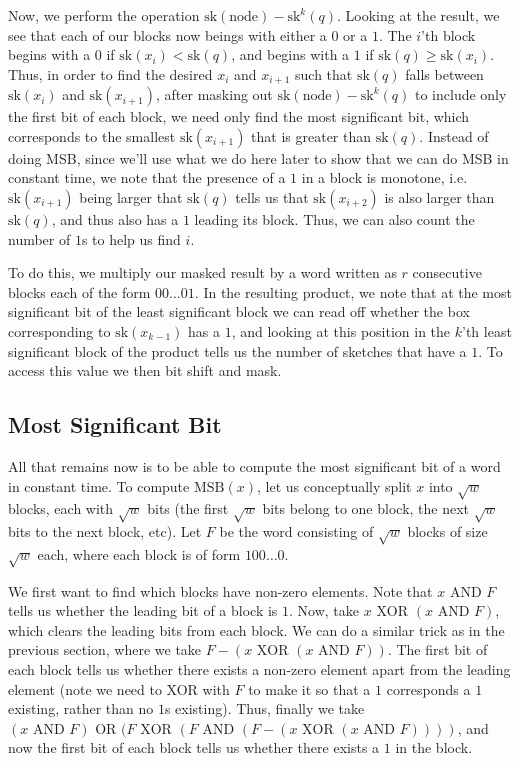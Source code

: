 \documentclass[11pt]{article}
\begin{document}
Now, we perform the operation $\text{sk}(\text{node}) - \text{sk}^k(q)$. Looking at the result, we see that each of our blocks now beings with either a $0$ or a $1$. The $i$'th block begins with a $0$ if $\text{sk}(x_i) < \text{sk}(q)$, and begins with a $1$ if $\text{sk}(q)\geq \text{sk}(x_i)$. Thus, in order to find the desired $x_i$ and $x_{i+1}$ such that $\text{sk}(q)$ falls between $\text{sk}(x_{i})$ and $\text{sk}(x_{i+1})$, after masking out $\text{sk}(\text{node}) - \text{sk}^k(q)$ to include only the first bit of each block, we need only find the most significant bit, which corresponds to the smallest $\text{sk}(x_{i+1})$ that is greater than $\text{sk}(q)$. Instead of doing MSB, since we'll use what we do here later to show that we can do MSB in constant time, we note that the presence of a $1$ in a block is monotone, i.e. $\text{sk}(x_{i+1})$ being larger that $\text{sk}(q)$ tells us that $\text{sk}(x_{i+2})$ is also larger than $\text{sk}(q)$, and thus also has a $1$ leading its block. Thus, we can also count the number of $1$s to help us find $i$.

To do this, we multiply our masked result by a word written as $r$ consecutive blocks each of the form $00\ldots 01$. In the resulting product, we note that at the most significant bit of the least significant block we can read off whether the box corresponding to $\text{sk}(x_{k-1})$ has a $1$, and looking at this position in the $k$'th least significant block of the product tells us the number of sketches that have a $1$. To access this value we then bit shift and mask.

\subsection{Most Significant Bit}
All that remains now is to be able to compute the most significant bit of a word in constant time. To compute $\text{MSB}(x)$, let us conceptually split $x$ into $\sqrt{w}$ blocks, each with $\sqrt{w}$ bits (the first $\sqrt{w}$ bits belong to one block, the next $\sqrt{w}$ bits to the next block, etc). Let $F$ be the word consisting of $\sqrt{w}$ blocks of size $\sqrt{w}$ each, where each block is of form $100\ldots 0$.

We first want to find which blocks have non-zero elements. Note that $x\text{ AND }F$ tells us whether the leading bit of a block is $1$. Now, take $x\text{ XOR }(x\text{ AND } F)$, which clears the leading bits from each block. We can do a similar trick as in the previous section, where we take $F - (x\text{ XOR }(x\text{ AND } F))$. The first bit of each block tells us whether there exists a non-zero element apart from the leading element (note we need to XOR with $F$ to make it so that a $1$ corresponds a $1$ existing, rather than no $1$s existing). Thus, finally we take $(x\text{ AND } F)\text{ OR }(F\text{ XOR } (F\text{ AND }(F - (x\text{ XOR }(x\text{ AND } F))))$, and now the first bit of each block tells us whether there exists a $1$ in the block.
\end{document}
